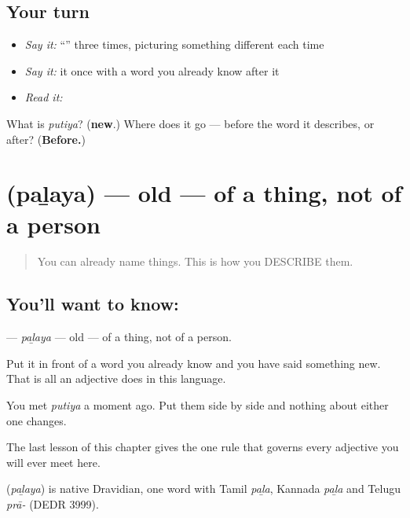 \subsection*{Your turn}
\begin{itemize}
\raggedright
  \item \emph{Say it:} \textquotedblleft{}\textquotedblright{} three times, picturing something different each time
  \item \emph{Say it:} it once with a word you already know after it
  \item \emph{Read it:} \textbf{}
\end{itemize}

\begin{tcolorbox}[breakable,colback=teal!4,colframe=teal!35!black,title={Before you move on}]
What is \emph{putiya}? (\textbf{new}.) Where does it go — before the word it describes, or after? (\textbf{Before.})
\end{tcolorbox}
\section[\texorpdfstring{\ml{പഴയ} (paḻaya)}{പഴയ (paḻaya)}]{ (paḻaya) — old — of a thing, not of a person}

\label{lesson:ML-C42-old}



\begin{quote}
You can already name things. This is how you DESCRIBE them.
\end{quote}

\subsection*{You'll want to know: }
\textbf{} — \emph{paḻaya} — old — of a thing, not of a person.

Put it in front of a word you already know and you have said something new. That is all an adjective does in this language.

You met \textbf{} \emph{putiya} a moment ago. Put them side by side and nothing about either one changes.

The last lesson of this chapter gives the one rule that governs every adjective you will ever meet here.

\begin{cousinweb}
\textbf{} (\emph{paḻaya}) is native Dravidian, one word with Tamil \emph{paḻa}, Kannada \emph{paḻa} and Telugu \emph{prā-} (DEDR 3999).
\end{cousinweb}

